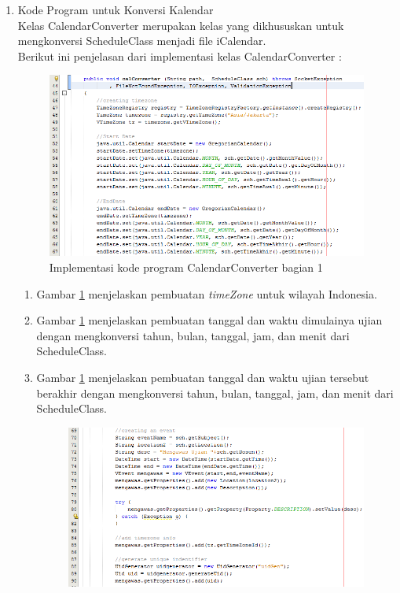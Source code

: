 \begin{enumerate}
\item Kode Program untuk Konversi Kalendar \\
Kelas CalendarConverter merupakan kelas yang dikhususkan untuk mengkonversi ScheduleClass menjadi file iCalendar. \\
Berikut ini penjelasan dari implementasi kelas CalendarConverter :
\begin{figure}[H]
		\centering
		\includegraphics[scale=0.7]{Gambar/calConverter1}
		\caption{Implementasi kode program CalendarConverter bagian 1}
		\label{fig:calConverter1}
		\end{figure}
\begin{enumerate}
	\item Gambar \ref{fig:calConverter1} menjelaskan pembuatan \textit{timeZone} untuk wilayah Indonesia.
	\item Gambar \ref{fig:calConverter1} menjelaskan pembuatan tanggal dan waktu dimulainya ujian dengan mengkonversi tahun, bulan, tanggal, jam, dan menit dari ScheduleClass.
	\item Gambar \ref{fig:calConverter1} menjelaskan pembuatan tanggal dan waktu ujian tersebut berakhir dengan mengkonversi tahun, bulan, tanggal, jam, dan menit dari ScheduleClass.
	\begin{figure}[H]
		\centering
		\includegraphics[scale=0.7]{Gambar/calConverter2}

\end{figure}
\end{enumerate}
\end{enumerate}
